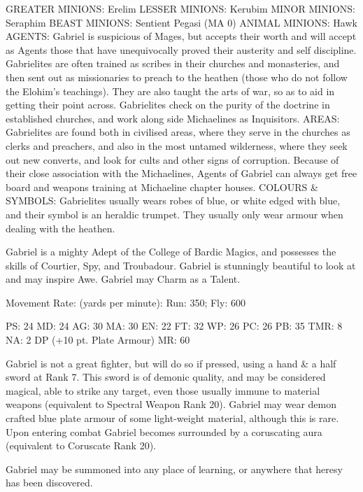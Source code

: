 \begin{Description}
  GREATER MINIONS: Erelim 
LESSER MINIONS: Kerubim 
MINOR MINIONS: Seraphim 
BEAST MINIONS: Sentient Pegasi (MA 0)
ANIMAL MINIONS: Hawk
AGENTS: Gabriel is suspicious of Mages, but accepts their worth  and will accept as Agents those that have unequivocally proved their austerity and self discipline. Gabrielites are often trained as scribes in their churches and monasteries, and then sent out as missionaries to preach to the heathen (those who do not follow the Elohim's teachings). They are also taught the arts of war, so as to aid in getting their point across. Gabrielites check on the purity of the doctrine in established churches, and work along side Michaelines as Inquisitors. 
AREAS: Gabrielites are found both in civilised areas, where they serve in the churches as clerks and preachers, and also in the most untamed wilderness, where they seek out new converts, and look for cults and other signs of corruption. Because of their close association with the Michaelines, Agents of Gabriel can always get free board and weapons training at Michaeline chapter houses.
COLOURS \& SYMBOLS: Gabrielites usually wears robes of blue, or white edged with blue, and their symbol is an heraldic trumpet. They usually only wear armour when dealing with the heathen.
\item[Avatar abilities] Gabriel is a mighty Adept of the College of Bardic Magics, and possesses  the skills of Courtier, Spy, and Troubadour. Gabriel is stunningly beautiful to look at and may inspire Awe. Gabriel may Charm as a Talent.

Movement Rate: (yards per minute): Run: 350; Fly: 600

PS: 24	MD: 24	AG: 30	MA: 30
EN: 22	FT: 32	WP: 26	PC: 26
PB: 35	TMR: 8	NA: 2 DP (+10 pt. Plate Armour)
MR: 60

\item[Weapons] Gabriel is not a great fighter, but will do so if pressed, using a hand \& a half sword at Rank 7. This sword is of demonic quality, and may be considered magical, able to strike any target, even those usually immune to material weapons (equivalent to Spectral Weapon Rank 20). Gabriel may wear demon crafted blue plate armour of some light-weight material, although this is rare. Upon entering combat Gabriel becomes surrounded by a coruscating aura (equivalent to Coruscate Rank 20).

\item[Avatar Summoning] Gabriel may be summoned into any place of learning, or anywhere that heresy has been discovered.

\end{Description}

